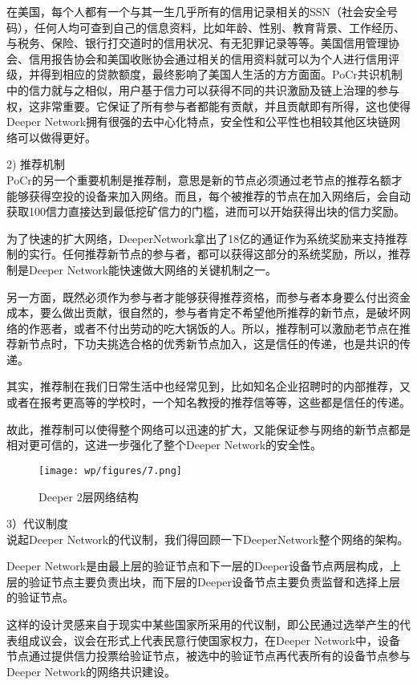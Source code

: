 \documentclass[a4paper]{article}
\begin{document}
在美国，每个人都有一个与其一生几乎所有的信用记录相关的SSN（社会安全号码），任何人均可查到自己的信息资料，比如年龄、性别、教育背景、工作经历、与税务、保险、银行打交道时的信用状况、有无犯罪记录等等。美国信用管理协会、信用报告协会和美国收账协会通过相关的信用资料就可以为个人进行信用评级，并得到相应的贷款额度，最终影响了美国人生活的方方面面。PoCr共识机制中的信力就与之相似，用户基于信力可以获得不同的共识激励及链上治理的参与权，这非常重要。它保证了所有参与者都能有贡献，并且贡献即有所得，这也使得Deeper Network拥有很强的去中心化特点，安全性和公平性也相较其他区块链网络可以做得更好。

2) 推荐机制\\
PoCr的另一个重要机制是推荐制，意思是新的节点必须通过老节点的推荐名额才能够获得空投的设备来加入网络。而且，每个被推荐的节点在加入网络后，会自动获取100信力直接达到最低挖矿信力的门槛，进而可以开始获得出块的信力奖励。

为了快速的扩大网络，DeeperNetwork拿出了18亿的通证作为系统奖励来支持推荐制的实行。任何推荐新节点的参与者，都可以获得这部分的系统奖励，所以，推荐制是Deeper Network能快速做大网络的关键机制之一。

另一方面，既然必须作为参与者才能够获得推荐资格，而参与者本身要么付出资金成本，要么做出贡献，很自然的，参与者肯定不希望他所推荐的新节点，是破坏网络的作恶者，或者不付出劳动的吃大锅饭的人。所以，推荐制可以激励老节点在推荐新节点时，下功夫挑选合格的优秀新节点加入，这是信任的传递，也是共识的传递。

其实，推荐制在我们日常生活中也经常见到，比如知名企业招聘时的内部推荐，又或者在报考更高等的学校时，一个知名教授的推荐信等等，这些都是信任的传递。

故此，推荐制可以使得整个网络可以迅速的扩大，又能保证参与网络的新节点都是相对更可信的，这进一步强化了整个Deeper Network的安全性。

\begin{figure}[hhhh]
\centering
\texttt{[image: wp/figures/7.png]}
\caption{Deeper 2层网络结构}
\label{fig:hotstuff}
\end{figure}


3）代议制度\\
说起Deeper Network的代议制，我们得回顾一下DeeperNetwork整个网络的架构。

Deeper Network是由最上层的验证节点和下一层的Deeper设备节点两层构成，上层的验证节点主要负责出块，而下层的Deeper设备节点主要负责监督和选择上层的验证节点。

这样的设计灵感来自于现实中某些国家所采用的代议制，即公民通过选举产生的代表组成议会，议会在形式上代表民意行使国家权力，在Deeper Network中，设备节点通过提供信力投票给验证节点，被选中的验证节点再代表所有的设备节点参与Deeper Network的网络共识建设。
\end{document}
